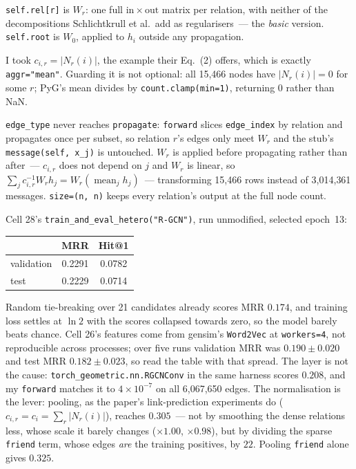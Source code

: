 \noindent
\texttt{self.rel[r]} is $W_r$: one full $\mathrm{in}\times\mathrm{out}$ matrix per
relation, with neither of the decompositions Schlichtkrull et al.\ add as
regularisers~--- the \emph{basic} version. \texttt{self.root} is $W_0$, applied
to $h_i$ outside any propagation.

I took $c_{i,r}=|N_r(i)|$, the example their Eq.~(2) offers, which is exactly
\texttt{aggr="mean"}. Guarding it is not optional: all 15{,}466 nodes have
$|N_r(i)|=0$ for some $r$; PyG's mean divides by \texttt{count.clamp(min=1)},
returning $0$ rather than NaN.

\texttt{edge\_type} never reaches \texttt{propagate}: \texttt{forward} slices
\texttt{edge\_index} by relation and propagates once per subset, so relation $r$'s
edges only meet $W_r$ and the stub's
\texttt{message(self,\,x\_j)} is untouched. $W_r$ is applied before propagating rather
than after~--- $c_{i,r}$ does not depend on $j$ and $W_r$ is linear, so
$\sum_{j} c_{i,r}^{-1} W_r h_j = W_r\!\left(\operatorname{mean}_{j} h_j\right)$~---
transforming 15{,}466 rows instead of 3{,}014{,}361 messages. \texttt{size=(n,\,n)}
keeps every relation's output at the full node count.

\medskip
\noindent
Cell 28's \texttt{train\_and\_eval\_hetero("R-GCN")}, run unmodified, selected
epoch~13:

\begin{center}
\begin{tabular}{lcc}
\toprule
 & MRR & Hit@1 \\
\midrule
validation & 0.2291 & 0.0782 \\
test       & 0.2229 & 0.0714 \\
\bottomrule
\end{tabular}
\end{center}

\noindent
Random tie-breaking over 21 candidates already scores MRR $0.174$, and training loss
settles at $\ln 2$ with the scores collapsed towards zero, so the model barely beats
chance. Cell 26's features come from gensim's \texttt{Word2Vec} at \texttt{workers=4},
not reproducible across processes; over five runs validation MRR was $0.190\pm0.020$
and test MRR $0.182\pm0.023$, so read the table with that spread. The layer is not the cause:
\texttt{torch\_geometric.nn.RGCNConv} in the same harness scores $0.208$, and my
\texttt{forward} matches it to $4\times10^{-7}$ on all 6{,}067{,}650 edges. The normalisation is
the lever: pooling, as the paper's link-prediction experiments do
($c_{i,r}=c_i=\sum_r|N_r(i)|$), reaches $0.305$~--- not by smoothing the dense
relations less, whose scale it barely changes ($\times1.00$, $\times0.98$), but by
dividing the sparse \texttt{friend} term, whose edges \emph{are} the training positives,
by $22$. Pooling \texttt{friend} alone gives $0.325$.
